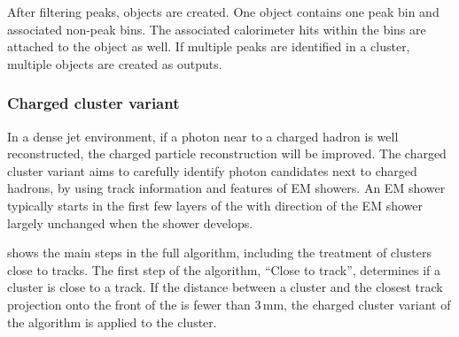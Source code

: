
After  filtering peaks,  \ShowerPeak  objects are created. One \ShowerPeak object contains one peak bin and associated non-peak bins. The associated calorimeter hits within the bins are attached to the \ShowerPeak object as well. If multiple peaks are identified in a cluster, multiple \ShowerPeak objects are created as outputs.



\subsubsection{Charged cluster variant}
\label{sec:photon2Dtrack}

In a dense jet environment, if a photon near to a charged hadron is well reconstructed, the charged particle reconstruction will be improved. The charged cluster variant aims to carefully identify photon candidates next to charged hadrons, by using track information and features of EM showers. An EM shower typically starts in the first few layers of the \ECAL with  direction of the EM shower largely unchanged when the shower develops.






 shows the main steps in the full \peakFinding algorithm, including the treatment of clusters close to tracks. The first step of the algorithm, ``Close to track'', determines if a cluster is close to a track. If the distance between a cluster and the closest track projection onto the front of the \ECAL is fewer than 3\,mm, the charged cluster variant of the \peakFinding algorithm is applied to the cluster.

